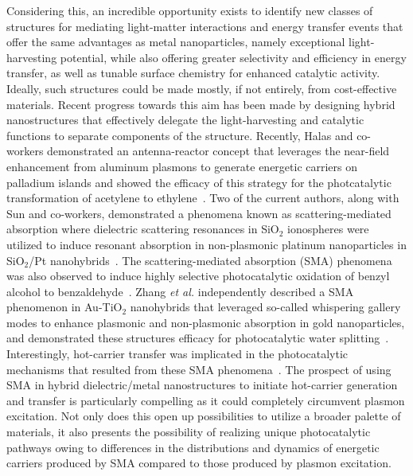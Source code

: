 \documentclass[journal=jpclcd,manuscript=letter]{achemso}
\begin{document}
Considering this, an incredible opportunity exists to identify new classes of structures for mediating light-matter interactions and energy transfer events that offer the same advantages as metal nanoparticles, 
namely exceptional light-harvesting potential, while also offering greater selectivity and efficiency in energy transfer, as well as tunable surface chemistry for enhanced catalytic activity.  
Ideally, such structures could be made mostly, if not entirely, from cost-effective materials.  Recent progress towards this aim has been made by designing hybrid 
nanostructures that effectively delegate the light-harvesting and catalytic functions to separate components of the structure.  Recently, Halas and co-workers 
demonstrated an antenna-reactor concept that leverages the near-field enhancement from aluminum plasmons to generate energetic carriers on 
palladium islands and showed the efficacy of this strategy for the photcatalytic transformation of acetylene to ethylene~\cite{SZZ_PNAS_2016}.
Two of the current authors, along with Sun and co-workers, demonstrated a phenomena known as scattering-mediated absorption where dielectric
scattering resonances in SiO$_2$ ionospheres were utilized to induce resonant absorption in non-plasmonic platinum nanoparticles in SiO$_2$/Pt nanohybrids~\cite{ZHX_NatPhoton_2016}.
The scattering-mediated absorption (SMA) phenomena was also observed to induce highly selective photocatalytic oxidation of benzyl alcohol to benzaldehyde~\cite{ZHX_NatPhoton_2016}.
Zhang {\it et al.} independently described a SMA phenomenon in Au-TiO$_2$ nanohybrids that leveraged so-called whispering gallery modes to 
enhance plasmonic and non-plasmonic absorption in gold nanoparticles, and demonstrated these structures efficacy for photocatalytic water splitting~\cite{ZJM_ACSNano_2016}.
Interestingly, hot-carrier transfer was implicated in the photocatalytic mechanisms that resulted from these SMA phenomena~\cite{ZHX_NatPhoton_2016,ZJM_ACSNano_2016}.
The prospect of using SMA in hybrid dielectric/metal nanostructures to initiate hot-carrier generation and transfer is particularly 
compelling as it could completely circumvent plasmon excitation.  Not only does this open up possibilities to utilize a broader palette of materials, it also
presents the possibility of realizing unique photocatalytic pathways owing to differences in the distributions and dynamics of energetic carriers produced by SMA compared
to those produced by plasmon excitation.    
\end{document}
